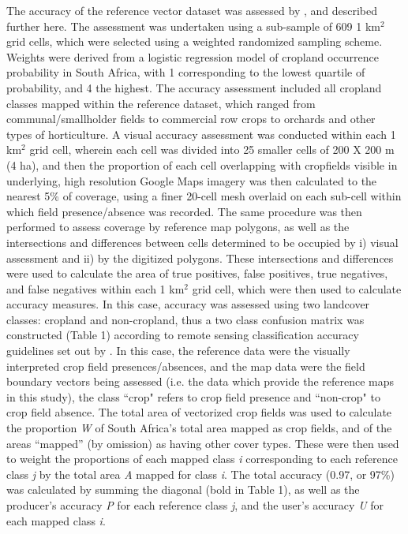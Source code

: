 \documentclass[11pt, titlepage]{article}
\begin{document}
The accuracy of the reference vector dataset was assessed by \citet{estes_platform_2016}, and described further here. The assessment was undertaken using a sub-sample of 609 1 km$^2$ grid cells, which were selected using a weighted randomized sampling scheme. Weights were derived from a logistic regression model of cropland occurrence probability in South Africa, with 1 corresponding to the lowest quartile of probability, and 4 the highest. The accuracy assessment included all cropland classes mapped within the reference dataset, which ranged from communal/smallholder fields to commercial row crops to orchards and other types of horticulture. A visual accuracy assessment was conducted within each 1 km$^2$ grid cell, wherein each cell was divided into 25 smaller cells of 200 X 200 m (4 ha), and then the proportion of each cell overlapping with cropfields visible in underlying, high resolution Google Maps imagery was then calculated to the nearest 5\% of coverage, using a finer 20-cell mesh overlaid on each sub-cell within which field presence/absence was recorded. The same procedure was then performed to assess coverage by reference map polygons, as well as the intersections and differences between cells determined to be occupied by i) visual assessment and ii) by the digitized polygons. These intersections and differences were used to calculate the area of true positives, false positives, true negatives, and false negatives within each 1 km$^2$ grid cell, which were then used to calculate accuracy measures.  In this case, accuracy was assessed using two landcover classes: cropland and non-cropland, thus a two class confusion matrix was constructed (Table 1) according to remote sensing classification accuracy guidelines set out by \citet{olofsson_good_2014}. In this case, the reference data were the visually interpreted crop field presences/absences, and the map data were the field boundary vectors being assessed (i.e. the data which provide the reference maps in this study), the class ``crop" refers to crop field presence and ``non-crop" to crop field absence.  The total area of vectorized crop fields was used to calculate the proportion \emph{W} of South Africa's total area mapped as crop fields, and of the areas ``mapped'' (by omission) as having other cover types.  These were then used to weight the proportions of each mapped class \emph{i} corresponding to each reference class \emph{j} by the total area \emph{A} mapped for class \emph{i}. The total accuracy (0.97, or 97\%) was calculated by summing the diagonal (bold in Table 1), as well as the producer's accuracy \emph{P} for each reference class \emph{j}, and the user's accuracy \emph{U} for each mapped class \emph{i}.  
\end{document}
